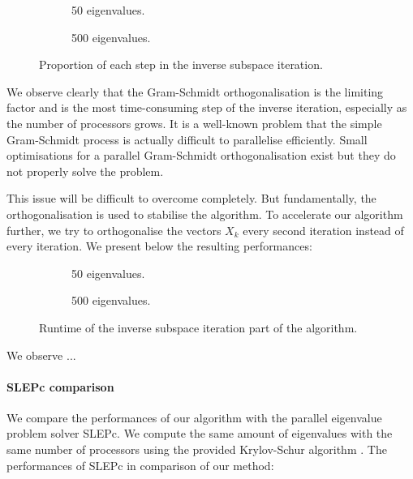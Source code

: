 \begin{figure}[H]
  \centering
  \begin{subfigure}[b]{0.4\textwidth}
   
   \caption{50 eigenvalues.}
  \end{subfigure}
  \begin{subfigure}[b]{0.4\textwidth}
   
   \caption{500 eigenvalues.}
  \end{subfigure}
  \caption{Proportion of each step in the inverse subspace iteration.}
\end{figure}

We observe clearly that the Gram-Schmidt orthogonalisation is the limiting factor and is the most time-consuming step of the inverse iteration, especially as the number of processors grows.
It is a well-known problem that the simple Gram-Schmidt process is actually difficult to parallelise efficiently.
Small optimisations for a parallel Gram-Schmidt orthogonalisation exist \cite{katagiri_parallel_gram_schmidt_2003} but they do not properly solve the problem.

This issue will be difficult to overcome completely.
But fundamentally, the orthogonalisation is used to stabilise the algorithm.
To accelerate our algorithm further, we try to orthogonalise the vectors \(X_k\) every second iteration instead of every iteration.
We present below the resulting performances:

\begin{figure}[H]
  \centering
  \begin{subfigure}[b]{0.5\textwidth}
   
   \caption{50 eigenvalues.}
  \end{subfigure}
  \begin{subfigure}[b]{0.45\textwidth}
   
   \caption{500 eigenvalues.}
  \end{subfigure}
  \caption{Runtime of the inverse subspace iteration part of the algorithm.}
\end{figure}

We observe ...

\paragraph{SLEPc comparison}
We compare the performances of our algorithm with the parallel eigenvalue problem solver SLEPc.
We compute the same amount of eigenvalues with the same number of processors using the provided Krylov-Schur algorithm \cite{stewart_krylovschur_2002}.
The performances of SLEPc in comparison of our method:

